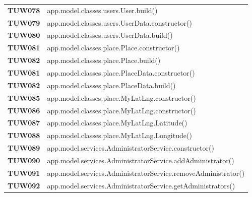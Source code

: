 \documentclass[../../piano-di-qualifica.tex]{subfiles}
\begin{document}
\begin{longtable}[H]{>{\centering\bfseries}m{3cm} >{}m{13cm}}
TUW078             & app.model.classes.users.User.build\@()\\


TUW079             & app.model.classes.users.UserData.constructor\@()\\

TUW080             & app.model.classes.users.UserData.build\@()\\


TUW081             & app.model.classes.place.Place.constructor\@()\\

TUW082             & app.model.classes.place.Place.build\@()\\


TUW081             & app.model.classes.place.PlaceData.constructor\@()\\

TUW082             & app.model.classes.place.PlaceData.build\@()\\


TUW085              & app.model.classes.place.MyLatLng.constructor\@()\\

TUW086             & app.model.classes.place.MyLatLng.constructor\@()\\

TUW087             & app.model.classes.place.MyLatLng.Latitude\@()\\

TUW088             & app.model.classes.place.MyLatLng.Longitude\@()\\


TUW089             & app.model.services.AdministratorService.constructor\@()\\

TUW090             & app.model.services.AdministratorService.addAdministrator\@()\\

TUW091             & app.model.services.AdministratorService.removeAdministrator\@()\\

TUW092            & app.model.services.AdministratorService.getAdministrators\@()\\



\end{longtable}
\end{document}
